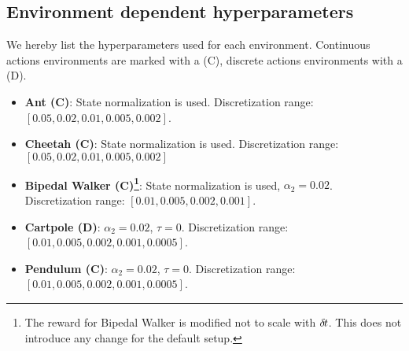 \subsection{Environment dependent hyperparameters}
We hereby list the hyperparameters used for each environment. Continuous actions environments are marked with a
(C), discrete actions environments with a (D).
\begin{itemize}
	\item {\bf Ant (C)}: State normalization is used. Discretization range: $[0.05, 0.02, 0.01, 0.005, 0.002]$.
	\item {\bf Cheetah (C)}: State normalization is used. Discretization range: $[0.05, 0.02, 0.01, 0.005, 0.002]$
	\item {\bf Bipedal Walker (C)\footnote{
				The reward for Bipedal Walker is modified not to scale with ${\delta\hspace{-.1em}t}$. This does not introduce any change for the default setup.
		}}: State normalization is used, $\alpha_2 = 0.02$. Discretization range: $[0.01, 0.005, 0.002, 0.001]$.
	\item {\bf Cartpole (D)}: $\alpha_2 = 0.02$, $\tau = 0$. Discretization range: $[0.01, 0.005, 0.002, 0.001, 0.0005]$.
	\item {\bf Pendulum (C)}: $\alpha_2 = 0.02$, $\tau = 0$. Discretization range: $[0.01, 0.005, 0.002, 0.001, 0.0005]$.

\end{itemize}
